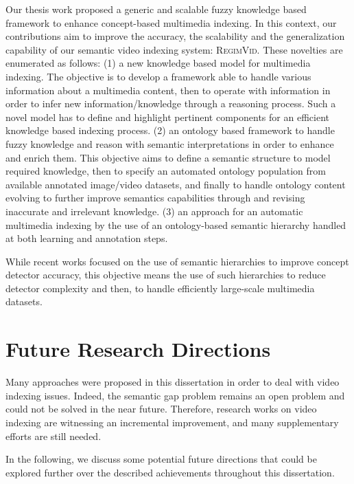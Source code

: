 	Our thesis work proposed a generic and scalable fuzzy knowledge based framework to enhance 
	concept-based multimedia indexing. In this context, our contributions aim to improve the accuracy, 
	the scalability and the generalization capability of our semantic video indexing system: \textsc{RegimVid}. 
	These novelties are enumerated as follows: 
	(1) a new knowledge based model for multimedia indexing. 
	The objective is to develop a framework able to handle various information about a multimedia content, 
	then to operate with  information in order to infer new information/knowledge through a reasoning process. 
	Such a novel model has to define and highlight pertinent components for an efficient knowledge based indexing process.
	(2) an ontology based framework to handle fuzzy knowledge and reason with semantic interpretations 
	in order to enhance and enrich them. This objective aims to define a semantic structure to model 
	required knowledge, then to specify an automated ontology population from available annotated 
	image/video datasets, and finally to handle ontology content evolving to further improve 
	semantics capabilities through  and revising inaccurate and irrelevant knowledge.
	(3) an approach for an automatic multimedia indexing by the use of an ontology-based semantic 
	hierarchy handled at both learning and annotation steps. 

	While recent works focused on the use of semantic hierarchies to improve concept detector accuracy, 
	this objective means the use of such hierarchies to reduce detector complexity and then, to handle 
	efficiently large-scale multimedia datasets.


	\section{Future Research Directions}
	Many approaches were proposed in this dissertation in order to deal with video indexing 
	issues. Indeed, the semantic gap problem remains an open problem and could not be solved in 
	the near future. Therefore, research works on video indexing are witnessing an incremental
	improvement, and many supplementary efforts are still needed.

	In the following, we discuss some potential future directions that could be explored further over 
	the described achievements throughout this dissertation.

